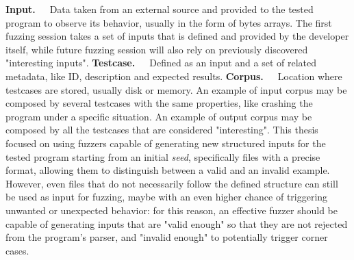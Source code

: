 \documentclass[Lau,oneside]{sapthesis}%
\begin{document}
\newline \newline
\textbf{Input.}\ \ \ Data taken from an external source and provided to the tested program to observe its behavior, usually in the form of bytes arrays. The first fuzzing session takes a set of inputs that is defined and provided by the developer itself, while future fuzzing session will also rely on previously discovered "interesting inputs". 
\newline \newline
\textbf{Testcase.}\ \ \ Defined as an input and a set of related metadata, like ID, description and expected results.
\newline \newline
\textbf{Corpus.}\ \ \ Location where testcases are stored, usually disk or memory. An example of input corpus may be composed by several testcases with the same properties, like crashing the program under a specific situation. An example of output corpus may be composed by all the testcases that are considered "interesting".
\newline \newline \newline
This thesis focused on using fuzzers capable of generating new structured inputs for the tested program starting from an initial \textit{seed}, specifically files with a precise format, allowing them to distinguish between a valid and an invalid example. 
\newline
However, even files that do not necessarily follow the defined structure can still be used as input for fuzzing, maybe with an even higher chance of triggering unwanted or unexpected behavior: for this reason, an effective fuzzer should be capable of generating inputs that are "valid enough" so that they are not rejected from the program's parser, and "invalid enough" to potentially trigger corner cases.
\end{document}
